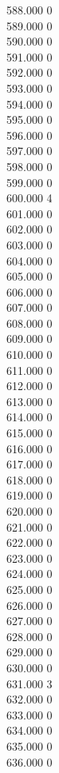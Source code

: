 { 588.000	0 \\
 589.000	0 \\
 590.000	0 \\
 591.000	0 \\
 592.000	0 \\
 593.000	0 \\
 594.000	0 \\
 595.000	0 \\
 596.000	0 \\
 597.000	0 \\
 598.000	0 \\
 599.000	0 \\
 600.000	4 \\
 601.000	0 \\
 602.000	0 \\
 603.000	0 \\
 604.000	0 \\
 605.000	0 \\
 606.000	0 \\
 607.000	0 \\
 608.000	0 \\
 609.000	0 \\
 610.000	0 \\
 611.000	0 \\
 612.000	0 \\
 613.000	0 \\
 614.000	0 \\
 615.000	0 \\
 616.000	0 \\
 617.000	0 \\
 618.000	0 \\
 619.000	0 \\
 620.000	0 \\
 621.000	0 \\
 622.000	0 \\
 623.000	0 \\
 624.000	0 \\
 625.000	0 \\
 626.000	0 \\
 627.000	0 \\
 628.000	0 \\
 629.000	0 \\
 630.000	0 \\
 631.000	3 \\
 632.000	0 \\
 633.000	0 \\
 634.000	0 \\
 635.000	0 \\
 636.000	0 \\
}
